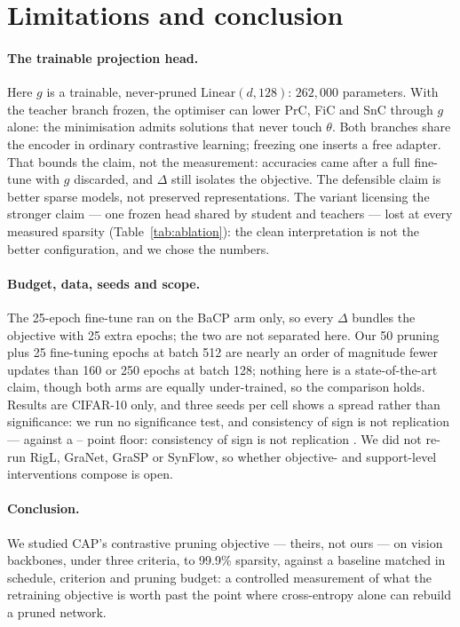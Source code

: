 \section{Limitations and conclusion}
\label{sec:limitations}
\label{sec:discussion}

\paragraph{The trainable projection head.}
Here $g$ is a trainable, never-pruned $\mathrm{Linear}(d,128)$:
$262{,}000$ parameters. With the teacher branch frozen, the optimiser can lower
PrC, FiC and SnC through $g$ alone: the minimisation admits solutions that never
touch $\theta$. Both branches share the encoder in ordinary contrastive
learning; freezing one inserts a free adapter. That bounds the claim, not the
measurement: accuracies came after a full fine-tune with $g$ discarded, and
$\Delta$ still isolates the objective. The defensible claim is better sparse
models, not preserved representations. The variant licensing the stronger claim --- one frozen head shared by student
and teachers --- lost at every measured sparsity (Table~\ref{tab:ablation}): the
clean interpretation is not the better configuration, and we chose the numbers.

\paragraph{Budget, data, seeds and scope.} The 25-epoch fine-tune ran on the BaCP arm only, so every $\Delta$ bundles the objective with 25 extra epochs; the two are not separated here.
Our 50 pruning plus 25 fine-tuning epochs at batch 512 are nearly an order of
magnitude fewer updates than 160 \citep{liu2021granet} or 250 \citep{li2025east}
epochs at batch 128; nothing here is a state-of-the-art claim, though both arms
are equally under-trained, so the comparison holds. Results are CIFAR-10 only,
and three seeds per cell shows a spread rather than significance: we run no
significance test, and consistency of sign is not replication --- against a
-- point floor:
consistency of sign is not replication \citep{bouthillier2021variance}. We did
not re-run RigL, GraNet, GraSP or SynFlow, so whether objective- and
support-level interventions compose is open.

\paragraph{Conclusion.}
We studied CAP's contrastive pruning objective \citep{xu2022cap} --- theirs, not
ours --- on vision backbones, under three criteria, to 99.9\% sparsity, against
a baseline matched in schedule, criterion and pruning budget: a controlled measurement of what the
retraining objective is worth past the point where cross-entropy alone can
rebuild a pruned network.
